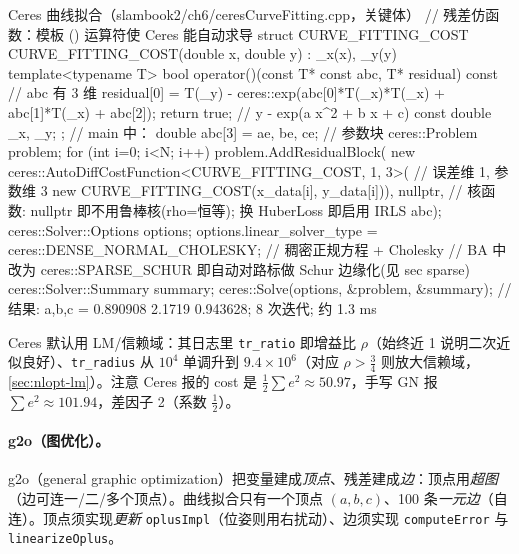 \begin{codebox}[C++]{Ceres 曲线拟合（slambook2/ch6/ceresCurveFitting.cpp，关键体）}
// 残差仿函数：模板 () 运算符使 Ceres 能自动求导
struct CURVE_FITTING_COST {
  CURVE_FITTING_COST(double x, double y) : _x(x), _y(y) {}
  template<typename T>
  bool operator()(const T* const abc, T* residual) const {  // abc 有 3 维
    residual[0] = T(_y) - ceres::exp(abc[0]*T(_x)*T(_x) + abc[1]*T(_x) + abc[2]);
    return true;                                             // y - exp(a x^2 + b x + c)
  }
  const double _x, _y;
};
// main 中：
double abc[3] = {ae, be, ce};                               // 参数块
ceres::Problem problem;
for (int i=0; i<N; i++)
  problem.AddResidualBlock(
    new ceres::AutoDiffCostFunction<CURVE_FITTING_COST, 1, 3>(  // 误差维 1, 参数维 3
      new CURVE_FITTING_COST(x_data[i], y_data[i])),
    nullptr,    // 核函数: nullptr 即不用鲁棒核(rho=恒等); 换 HuberLoss 即启用 IRLS
    abc);
ceres::Solver::Options options;
options.linear_solver_type = ceres::DENSE_NORMAL_CHOLESKY;  // 稠密正规方程 + Cholesky
// BA 中改为 ceres::SPARSE_SCHUR 即自动对路标做 Schur 边缘化(见 sec sparse)
ceres::Solver::Summary summary;
ceres::Solve(options, &problem, &summary);
// 结果: a,b,c = 0.890908 2.1719 0.943628; 8 次迭代; 约 1.3 ms
\end{codebox}

\noindent Ceres 默认用 LM/信赖域：其日志里 \texttt{tr\_ratio} 即增益比 $\rho$（始终近 1 说明二次近似良好）、\texttt{tr\_radius} 从 $10^4$ 单调升到 $9.4\times10^6$（对应 $\rho>\tfrac34$ 则放大信赖域，\cref{sec:nlopt-lm}）。注意 Ceres 报的 cost 是 $\tfrac12\sum e^2\approx50.97$，手写 GN 报 $\sum e^2\approx101.94$，差因子 2（系数 $\tfrac12$）。

\paragraph{g2o（图优化）。}\cite{gaoxiang2019slam14}
g2o（general graphic optimization）把变量建成\emph{顶点}、残差建成\emph{边}：顶点用\emph{超图}（边可连一/二/多个顶点）。曲线拟合只有一个顶点 $(a,b,c)$、100 条\emph{一元边}（自连）。顶点须实现\emph{更新} \texttt{oplusImpl}（位姿则用右扰动）、边须实现 \texttt{computeError} 与 \texttt{linearizeOplus}。


